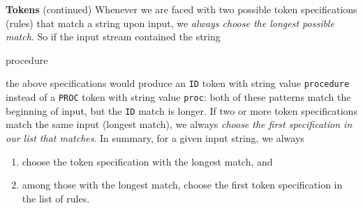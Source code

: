 \begin{minipage}[t]{\sw}
\slidenumber
\LARGE
{\bf Tokens} (continued)\exx
Whenever we are faced with two possible token specifications (rules)
that match a string upon input,
we {\em always choose the longest possible match}.
So if the input stream contained the string
\begin{qv}
procedure
\end{qv}
the above specifications would produce an \verb'ID' token
with string value \verb'procedure' instead of a \verb'PROC' token
with string value \verb'proc':
both of these patterns match the beginning of input,
but the \verb'ID' match is longer.\exx
If two or more token specifications
match the same input (longest match), we always
{\em choose the first specification in our list that matches}.\exx
In summary, for a given input string, we always
\begin{enumerate}
\item choose the token specification with the longest match, and
\item among those with the longest match, 
      choose the first token specification in the list of rules.
\end{enumerate}
\end{minipage}
